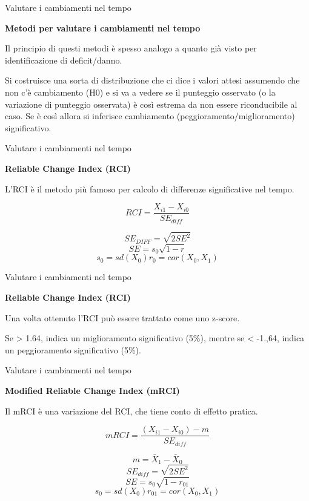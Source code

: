 \documentclass[
  ignorenonframetext,
]{beamer}
\begin{document}
\begin{frame}{Valutare i cambiamenti nel tempo}
\label{valutare-i-cambiamenti-nel-tempo-8}
\begin{center}
  \textbf{Metodi per valutare i cambiamenti nel tempo}
\end{center}
\vspace{1em}

Il principio di questi metodi è spesso analogo a quanto già visto per
identificazione di deficit/danno.

Si costruisce una sorta di distribuzione che ci dice i valori attesi
assumendo che non c'è cambiamento (H0) e si va a vedere se il punteggio
osservato (o la variazione di punteggio osservata) è così estrema da non
essere riconducibile al caso. Se è così allora si inferisce cambiamento
(peggioramento/miglioramento) significativo.
\end{frame}

\begin{frame}{Valutare i cambiamenti nel tempo}
\label{valutare-i-cambiamenti-nel-tempo-9}
\begin{center}
\textbf{Reliable Change Index (RCI)}
\end{center}
\vspace{2em}

L'RCI è il metodo più famoso per calcolo di differenze significative nel
tempo.

\[
  RCI = \frac{X_{i1} -X_{i0}}{SE_{diff}}
\]

\small

\[ SE_{DIFF} = \sqrt{2SE^2} \] \[SE = s_0\sqrt{1-r} \]
\[s_0 = sd(X_0)r_0 = cor(X_0,X_1)\]
\end{frame}

\begin{frame}{Valutare i cambiamenti nel tempo}
\label{valutare-i-cambiamenti-nel-tempo-10}
\begin{center}
\textbf{Reliable Change Index (RCI)}
\end{center}
\vspace{2em}

Una volta ottenuto l'RCI può essere trattato come uno z-score.

Se \textgreater{} 1.64, indica un miglioramento significativo (5\%),
mentre se \textless{} -1.,64, indica un peggioramento significativo
(5\%).
\end{frame}

\begin{frame}{Valutare i cambiamenti nel tempo}
\label{valutare-i-cambiamenti-nel-tempo-11}
\begin{center}
\textbf{Modified Reliable Change Index (mRCI)}
\end{center}
\vspace{2em}

Il mRCI è una variazione del RCI, che tiene conto di effetto pratica.

\[
mRCI = \frac{(X_{i1}-X_{i0})-m}{SE_{diff}}
\]

\small

\[m = \bar{X}_1 - \bar{X}_0\] \[SE_{diff} = \sqrt{2SE^2}\]
\[SE = s_0\sqrt{1-r_{01}}\] \[s_0 = sd(X_0)r_{01} = cor(X_0, X_1)\]
\end{frame}
\end{document}
